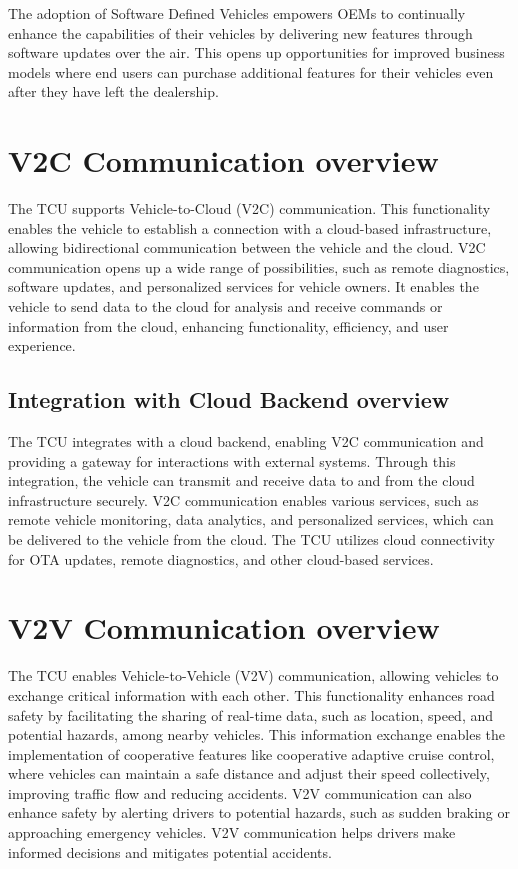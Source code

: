 \documentclass[
12pt,
oneside, 
onehalfspacing, 
nolistspacing, 
parskip, 
chapterinoneline, 
]{AASTCOMPUTER}
\begin{document}
The adoption of Software Defined Vehicles empowers OEMs to continually enhance the capabilities of their vehicles by delivering new features through software updates over the air. This opens up opportunities for improved business models where end users can purchase additional features for their vehicles even after they have left the dealership.



\section{V2C Communication overview}
The TCU supports Vehicle-to-Cloud (V2C) communication. This functionality enables the vehicle to establish a connection with a cloud-based infrastructure, allowing bidirectional communication between the vehicle and the cloud. V2C communication opens up a wide range of possibilities, such as remote diagnostics, software updates, and personalized services for vehicle owners. It enables the vehicle to send data to the cloud for analysis and receive commands or information from the cloud, enhancing functionality, efficiency, and user experience.

\subsection{Integration with Cloud Backend overview}
The TCU integrates with a cloud backend, enabling V2C communication and providing a gateway for interactions with external systems. Through this integration, the vehicle can transmit and receive data to and from the cloud infrastructure securely. V2C communication enables various services, such as remote vehicle monitoring, data analytics, and personalized services, which can be delivered to the vehicle from the cloud. The TCU utilizes cloud connectivity for OTA updates, remote diagnostics, and other cloud-based services.

\section{V2V Communication overview}
The TCU enables Vehicle-to-Vehicle (V2V) communication, allowing vehicles to exchange critical information with each other. This functionality enhances road safety by facilitating the sharing of real-time data, such as location, speed, and potential hazards, among nearby vehicles. This information exchange enables the implementation of cooperative features like cooperative adaptive cruise control, where vehicles can maintain a safe distance and adjust their speed collectively, improving traffic flow and reducing accidents. V2V communication can also enhance safety by alerting drivers to potential hazards, such as sudden braking or approaching emergency vehicles. V2V communication helps drivers make informed decisions and mitigates potential accidents.
\end{document}
